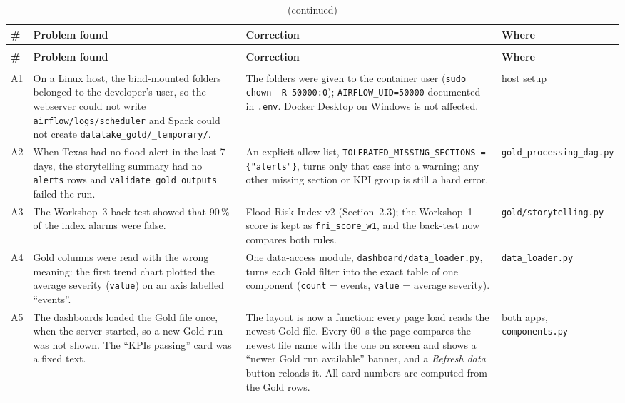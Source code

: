 \documentclass[stu, 12pt, letterpaper, donotrepeattitle, floatsintext, natbib]{apa7}
\begin{document}
{\scriptsize
\begin{xltabular}{\textwidth}{>{\raggedright\arraybackslash}p{0.7cm} >{\raggedright\arraybackslash}p{3.4cm} >{\raggedright\arraybackslash}p{4.6cm} >{\raggedright\arraybackslash}X}
\caption{Integration adjustments of Workshop 4.}\label{tab:adjust}\\
\toprule
\textbf{\#} & \textbf{Problem found} & \textbf{Correction} & \textbf{Where} \\
\midrule
\endfirsthead
\caption[]{(continued)}\\
\toprule
\textbf{\#} & \textbf{Problem found} & \textbf{Correction} & \textbf{Where} \\
\midrule
\endhead
\midrule{}\\
\endfoot
\bottomrule
\endlastfoot
A1 & On a Linux host, the bind-mounted folders belonged to the developer's user, so the webserver could not write \texttt{airflow/logs/scheduler} and Spark could not create \texttt{datalake\_gold/\_temporary/}. & The folders were given to the container user (\texttt{sudo chown -R 50000:0}); \texttt{AIRFLOW\_UID=50000} documented in \texttt{.env}. Docker Desktop on Windows is not affected. & host setup \\
A2 & When Texas had no flood alert in the last 7 days, the storytelling summary had no \texttt{alerts} rows and \texttt{validate\_gold\_outputs} failed the run. & An explicit allow-list, \texttt{TOLERATED\_MISSING\_SECTIONS = \{"alerts"\}}, turns only that case into a warning; any other missing section or KPI group is still a hard error. & \texttt{gold\_processing\_dag.py} \\
A3 & The Workshop~3 back-test showed that 90\,\% of the index alarms were false. & Flood Risk Index v2 (Section~2.3); the Workshop~1 score is kept as \texttt{fri\_score\_w1}, and the back-test now compares both rules. & \texttt{gold/storytelling.py} \\
A4 & Gold columns were read with the wrong meaning: the first trend chart plotted the average severity (\texttt{value}) on an axis labelled ``events''. & One data-access module, \texttt{dashboard/data\_loader.py}, turns each Gold filter into the exact table of one component (\texttt{count} = events, \texttt{value} = average severity). & \texttt{data\_loader.py} \\
A5 & The dashboards loaded the Gold file once, when the server started, so a new Gold run was not shown. The ``KPIs passing'' card was a fixed text. & The layout is now a function: every page load reads the newest Gold file. Every 60~s the page compares the newest file name with the one on screen and shows a ``newer Gold run available'' banner, and a \emph{Refresh data} button reloads it. All card numbers are computed from the Gold rows. & both apps, \texttt{components.py} \\

\end{xltabular}}
\end{document}
